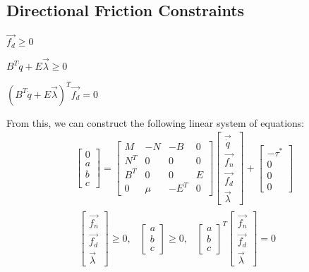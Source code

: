 \subsection{Directional Friction Constraints}
\begin{packed_item}
\item $\vec{f_d} \geq 0$
\item $B^T\dot{q} + E\vec{\lambda} \geq 0$
\item $(B^T\dot{q} + E\vec{\lambda})^T\vec{f_d} = 0$
\end{packed_item}
From this, we can construct the following linear system of equations:
\begin{equation}
\label{eq:bigsystem}
\begin{array}{cc}
\left[\begin{matrix}0 \\ a \\ b \\ c \end{matrix}\right] = \left[\begin{matrix}M & -N & -B & 0 \\ N^T & 0 & 0 & 0 \\ B^T & 0 & 0 & E \\ 0 & \mu & -E^T & 0\end{matrix}\right]\left[\begin{matrix}\vec{\dot{q}} \\ \vec{f_n} \\ \vec{f_d} \\ \vec{\lambda}\end{matrix}\right] + \left[\begin{matrix}-\tau^* \\ 0 \\ 0 \\0\end{matrix}\right] \\
\begin{matrix}
\left[\begin{matrix}\vec{f_n} \\ \vec{f_d} \\ \vec{\lambda}\end{matrix}\right] \geq 0, & 
\left[\begin{matrix}a \\ b \\ c\end{matrix}\right] \geq 0, &
\left[\begin{matrix}a \\ b \\ c\end{matrix}\right]^T\left[\begin{matrix}\vec{f_n} \\ \vec{f_d} \\ \vec{\lambda}\end{matrix}\right] = 0
\end{matrix}
\end{array}
\end{equation}

